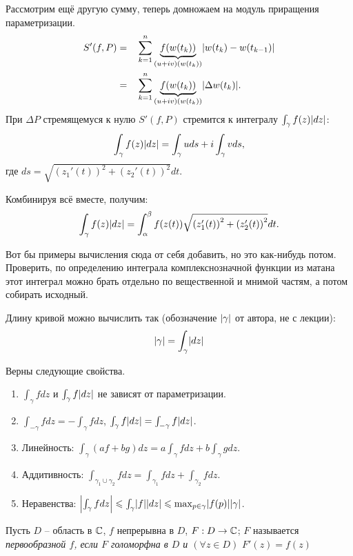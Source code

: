 Рассмотрим ещё другую сумму, теперь домножаем на модуль приращения параметризации.
\[
	\begin{aligned}
		S'(f, P) = & && \sum_{k = 1}^n \underbrace{f(w(t_k))}_{(u+iv)(w(t_k))} \mathopen{}\left\lvert w(t_k) - w(t_{k - 1})\right\rvert\mathclose{}\\
		= & && \sum_{k = 1}^n \underbrace{f(w(t_k))}_{(u+iv)(w(t_k))} \mathopen{}\left\lvert\Delta w(t_k)\right\rvert\mathclose{}.
	\end{aligned}
\]
При $\Delta P$ стремящемуся к нулю $S'(f, P)$ стремится к интегралу $\int_\gamma f(z) \mathopen{}\left\lvert dz\right\rvert\mathclose{}$:
\[
	\int_\gamma f(z) \mathopen{}\left\lvert dz\right\rvert\mathclose{} = \int_\gamma u ds + i \int_\gamma v ds,
\]
где $ds = \sqrt{{(z_1'(t))}^2 + {(z_2'(t))}^2} dt$.

\begin{anote}
	Комбинируя всё вместе, получим:
	\[
		\int_\gamma f(z) \mathopen{}\left\lvert dz\right\rvert\mathclose{} = \int_\alpha^\beta f(z(t)) \sqrt{{(z_1'(t))}^2 + {(z_2'(t))}^2} dt.
	\]
\end{anote}

{\color{red} Вот бы примеры вычисления сюда от себя добавить, но это как-нибудь потом. Проверить, по определению интеграла комплекснозначной функции из матана этот интеграл можно брать отдельно по вещественной и мнимой частям, а потом собирать исходный.}

\begin{note}
	Длину кривой можно вычислить так (обозначение $\mathopen{}\left\lvert\gamma\right\rvert\mathclose{}$ от автора, не с лекции):
	\[
		\mathopen{}\left\lvert\gamma\right\rvert\mathclose{} = \int_\gamma \mathopen{}\left\lvert dz\right\rvert\mathclose{}
	\]
\end{note}
\begin{theorem}
	Верны следующие свойства.
	\begin{enumerate}
		\item $\int_\gamma f dz$ и $\int_\gamma f \mathopen{}\left\lvert dz\right\rvert\mathclose{}$ не зависят от параметризации.
		\item $\int_{-\gamma} f dz = - \int_{\gamma} f dz$, $\int_\gamma f \mathopen{}\left\lvert dz\right\rvert\mathclose{} = \int_{-\gamma} f \mathopen{}\left\lvert dz\right\rvert\mathclose{}$.
		\item Линейность: $\int_\gamma (af + bg) dz = a \int_\gamma f dz + b \int_\gamma g dz$.
		\item Аддитивность: $\int_{\gamma_1 \cup \gamma_2} f dz = \int_{\gamma_1} f dz + \int_{\gamma_2} f dz$.
		\item Неравенства: $\mathopen{}\left\lvert\int_\gamma f dz\right\rvert\mathclose{} \leqslant \int_\gamma \mathopen{}\left\lvert f\right\rvert\mathclose{} \mathopen{}\left\lvert dz\right\rvert\mathclose{} \leqslant \max_{p \in \gamma} \mathopen{}\left\lvert f(p)\right\rvert\mathclose{} \mathopen{}\left\lvert\gamma\right\rvert\mathclose{}$.
	\end{enumerate}
\end{theorem}

\begin{definition}
	Пусть $D$ -- область в $\mathbb{C}$, $f$ непрерывна в $D$, $F: D \to \mathbb{C}$; $F$ называется \it{первообразной} $f$, если $F$ голоморфна в $D$ и $(\forall z \in D) \,\, F'(z) = f(z)$
\end{definition}

